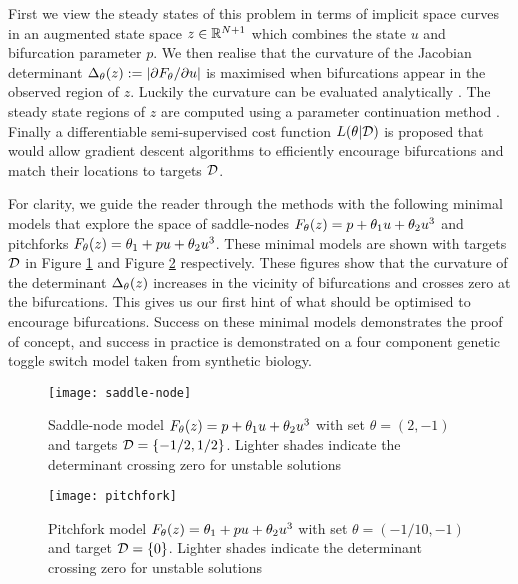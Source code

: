 First we view the steady states of this problem in terms of implicit space curves \cite{Goldman2005CurvatureSurfaces} in an augmented state space $z\in\mathbb{R}^{N+1}$ which combines the state $u$ and bifurcation parameter $p$. We then realise that the curvature of the Jacobian determinant $\Delta_{\theta}(z):=|\partial F_{\theta}/\partial u|$ is maximised when bifurcations appear in the observed region of $z$. Luckily the curvature can be evaluated analytically \cite{Goldman2005CurvatureSurfaces}. The steady state regions of $z$ are computed using a parameter continuation method \cite{Veltz2019PseudoArcLengthContinuation.jl,Farrell2016TheDiagrams}. Finally a differentiable semi-supervised cost function $L(\theta|\mathcal{D})$ is proposed that would allow gradient descent algorithms to efficiently encourage bifurcations and match their locations to targets $\mathcal{D}$.

For clarity, we guide the reader through the methods with the following minimal models that explore the space of saddle-nodes $F_{\theta}(z) = p + \theta_{1}u+\theta_{2}u^3$ and pitchforks $F_{\theta}(z) = \theta_{1} + p u+\theta_{2}u^3$. These minimal models are shown with targets $\mathcal{D}$ in Figure \ref{fig:saddle-node} and Figure \ref{fig:pitchfork} respectively. These figures show that the curvature of the determinant $\Delta_{\theta}(z)$ increases in the vicinity of bifurcations and crosses zero at the bifurcations. This gives us our first hint of what should be optimised to encourage bifurcations. Success on these minimal models demonstrates the proof of concept, and success in practice is demonstrated on a four component genetic toggle switch model taken from synthetic biology.
\begin{figure}[H]
\centering{}
\captionsetup{justification=centering}
\texttt{[image: saddle-node]}
\caption{Saddle-node model $F_{\theta}(z) = p + \theta_{1}u+\theta_{2}u^3$ with set $\theta=(2,-1)$ and targets $\mathcal{D}=\{-1/2,1/2\}$. Lighter shades indicate the determinant crossing zero for unstable solutions}
\label{fig:saddle-node}
\end{figure}
\begin{figure}[H]
\centering{}
\captionsetup{justification=centering}
\texttt{[image: pitchfork]}
\caption{Pitchfork model $F_{\theta}(z) = \theta_{1} + p u+\theta_{2}u^3$ with set $\theta=(-1/10,-1)$ and target $\mathcal{D}=\{0\}$. Lighter shades indicate the determinant crossing zero for unstable solutions}
\label{fig:pitchfork}
\end{figure}

